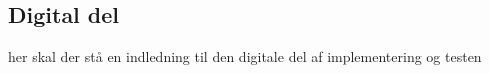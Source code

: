 \subsection{Digital del}
her skal der stå en indledning til den digitale del af implementering og testen